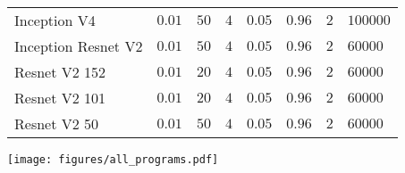 \documentclass{article}
\begin{document}
\begin{table}
\begin{tabular}{llllllll}
    Inception V4                & $0.01$ & $50$  & $4$  &  $0.05$ & $0.96$ & $2$ & $100000$  \\
    Inception Resnet V2    & $0.01$ & $50$  & $4$  &  $0.05$ & $0.96$ & $2$ & $60000$  \\
    Resnet V2 152            & $0.01$ & $20$  & $4$  &  $0.05$ & $0.96$ & $2$ & $60000$  \\
    Resnet V2 101           & $0.01$ & $20$  & $4$  &  $0.05$ & $0.96$ & $2$ & $60000$  \\
    Resnet V2 50           & $0.01$ & $50$  & $4$  &  $0.05$ & $0.96$ & $2$ & $60000$  \\
    \bottomrule
  \end{tabular}
\end{table}\newpage%
\centering
\texttt{[image: figures/all\_programs.pdf]}
\caption{{\bf Adversarial programs exhibit qualitative similarities and differences across both network and task.}
(a) Top: adversarial programs targeted to repurpose networks pre-trained on ImageNet to count squares in images.
Middle: adversarial programs targeted to repurpose networks pre-trained on ImageNet to function as MNIST classifiers.
Bottom: adversarial programs to cause the same networks to function as CIFAR-10 classifiers.
(b) Adversarial programs targeted to repurpose networks with randomly initialized parameters to function as MNIST classifiers.
}
\label{fig: programs}
\end{document}

